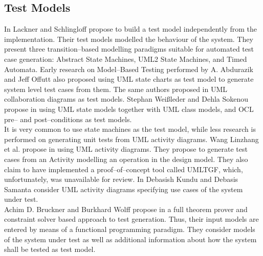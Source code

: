 \subsection{Test Models}
In \cite{lackner2012modeling} Lackner and Schlingloff propose to build a test model independently from the implementation. Their test models modelled the behaviour of the system. They present three transition--based modelling paradigms suitable for automated test case generation: Abstract State Machines, UML2 State Machines, and Timed Automata. Early research on Model--Based Testing performed by A. Abdurazik and Jeff Offutt \cite{Offutt99GeneratingTestsFromUmlSpec} also proposed using UML state charts as test model to generate system level test cases from them. The same authors proposed in \cite{Abdurazik00usingumlCollaborationTestGeneration} UML collaboration diagrams as test models. Stephan Wei{\ss}leder and Dehla Sokenou propose in \cite{weissleder2008automatic} using UML state models together with UML class models, and OCL pre-- and post--conditions as test models.\\
It is very common to use state machines as the test model, while less research is performed on generating unit tests from UML activity diagrams. Wang Linzhang et al. propose in \cite{Linzhang04GeneratingTestCasefromActivityGrayBoxMethod} using UML activity diagrams. They propose to generate test cases from an Activity modelling an operation in the design model. They also claim to have implemented a proof--of--concept tool called UMLTGF, which, unfortunately, was unavailable for review. %
In \cite{kundu2009novel} Debasish Kundu and Debasis Samanta consider UML activity diagrams specifying use cases of the system under test.%
\\
Achim D. Bruckner and Burkhard Wolff propose in \cite{brucker2012theoremProverBasedTesting} a full theorem prover and constraint solver based approach to test generation. Thus, their input models are entered by means of a functional programming paradigm. They consider models of the system under test as well as additional information about how the system shall be tested as test model.\\

